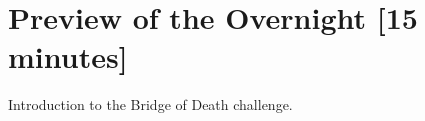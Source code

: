 \documentclass{tufte-handout}
\begin{document}
\section{Preview of the Overnight [15 minutes]}

Introduction to the Bridge of Death challenge.

\end{document}
